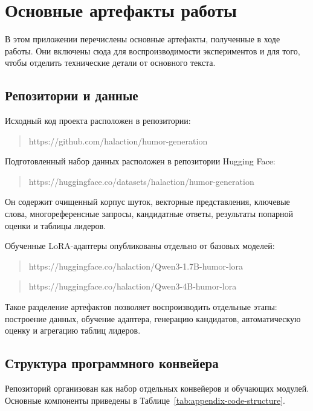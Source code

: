 \renewcommand{\thechapter}{\Asbuk{chapter}}

\chapter{Основные артефакты работы}

В этом приложении перечислены основные артефакты, полученные в ходе работы. Они включены сюда для воспроизводимости экспериментов и для того, чтобы отделить технические детали от основного текста.

\section{Репозитории и данные}

Исходный код проекта расположен в репозитории:
\begin{quote}
    \ttfamily https://github.com/halaction/humor-generation
\end{quote}

Подготовленный набор данных расположен в репозитории Hugging Face:
\begin{quote}
    \ttfamily https://huggingface.co/datasets/halaction/humor-generation
\end{quote}

Он содержит очищенный корпус шуток, векторные представления, ключевые слова, многореференсные запросы, кандидатные ответы, результаты попарной оценки и таблицы лидеров.

Обученные LoRA-адаптеры опубликованы отдельно от базовых моделей:
\begin{quote}
    \ttfamily https://huggingface.co/halaction/Qwen3-1.7B-humor-lora
\end{quote}
\begin{quote}
    \ttfamily https://huggingface.co/halaction/Qwen3-4B-humor-lora
\end{quote}

Такое разделение артефактов позволяет воспроизводить отдельные этапы: построение данных, обучение адаптера, генерацию кандидатов, автоматическую оценку и агрегацию таблиц лидеров.

\section{Структура программного конвейера}

Репозиторий организован как набор отдельных конвейеров и обучающих модулей. Основные компоненты приведены в Таблице~\ref{tab:appendix-code-structure}.

